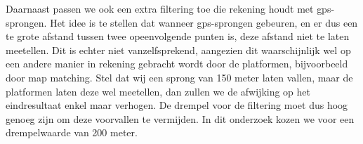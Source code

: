 Daarnaast passen we ook een extra filtering toe die rekening houdt met
\ac{gps}-sprongen. Het idee is te stellen dat wanneer \ac{gps}-sprongen
gebeuren, en er dus een te grote afstand tussen twee opeenvolgende punten is,
deze afstand niet te laten meetellen. Dit is echter niet vanzelfsprekend,
aangezien dit waarschijnlijk wel op een andere manier in rekening gebracht
wordt door de platformen, bijvoorbeeld door map matching. Stel dat wij een
sprong van 150 meter laten vallen, maar de platformen laten deze wel meetellen,
dan zullen we de afwijking op het eindresultaat enkel maar verhogen. De drempel
voor de filtering moet dus hoog genoeg zijn om deze voorvallen te vermijden. In
dit onderzoek kozen we voor een drempelwaarde van 200 meter.